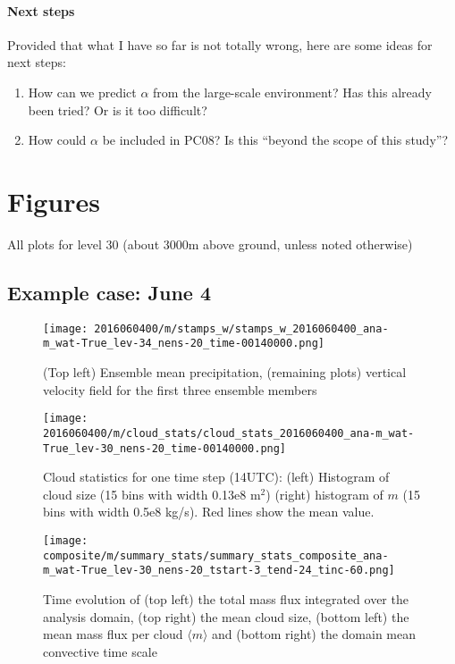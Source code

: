 \documentclass[a4paper, 12pt]{article}
\begin{document}
\paragraph{Next steps} Provided that what I have so far is not totally wrong, here are some ideas for next steps:
\begin{enumerate}
 \item How can we predict $\alpha$ from the large-scale environment? Has this already been tried? Or is it too difficult?
 \item How could $\alpha$ be included in PC08? Is this ``beyond the scope of this study''?
\end{enumerate}



\newpage

{\small
 }

\newpage
\section{Figures}
All plots for level 30 (about 3000m above ground, unless noted otherwise)

\subsection{Example case: June 4}
\begin{figure}[ht]
\noindent \centering
\texttt{[image: 2016060400/m/stamps\_w/stamps\_w\_2016060400\_ana-m\_wat-True\_lev-34\_nens-20\_time-00140000.png]}\\
\caption{(Top left) Ensemble mean precipitation, (remaining plots) vertical velocity field for the first three ensemble members} \label{fig:ex_stamps_w}
\end{figure}

\begin{figure}[ht]
\noindent \centering
\texttt{[image: 2016060400/m/cloud\_stats/cloud\_stats\_2016060400\_ana-m\_wat-True\_lev-30\_nens-20\_time-00140000.png]}\\
\caption{Cloud statistics for one time step (14UTC): (left) Histogram of cloud size (15 bins with width 0.13e8 m$^2$) (right) histogram of $m$ (15 bins with width 0.5e8 kg/s). Red lines show the mean value.} \label{fig:ex_cloud_stats}
\end{figure}

\begin{figure}[ht]
\noindent \centering
\texttt{[image: composite/m/summary\_stats/summary\_stats\_composite\_ana-m\_wat-True\_lev-30\_nens-20\_tstart-3\_tend-24\_tinc-60.png]}\\
\caption{Time evolution of (top left) the total mass flux integrated over the analysis domain, (top right) the mean cloud size, (bottom left) the mean mass flux per cloud $\langle m \rangle$ and (bottom right) the domain mean convective time scale} \label{fig:comp_summary_stats}
\end{figure}
\end{document}
